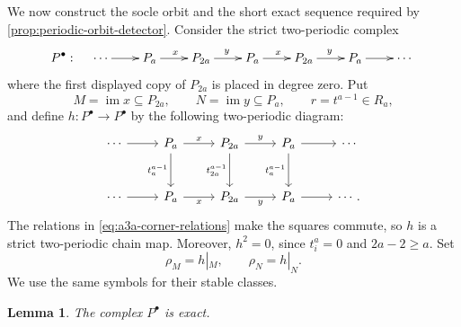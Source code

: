 \documentclass[a4paper,11pt,reqno]{amsart}
\newtheorem{lemma}[lemma]{Lemma}
\theoremstyle{definition}
\theoremstyle{plain}
\numberwithin{equation}{section}
\newcommand{\im}{\operatorname{im}}
\begin{document}
We now construct the socle orbit and the short exact sequence
required by \cref{prop:periodic-orbit-detector}.  Consider the strict
two-periodic complex
\begin{equation}
\label{eq:a3a-periodic-complex}
P^\bullet:\quad
\xymatrix@C=1.8pc{
\cdots\ar[r]&P_a\ar[r]^{x}&P_{2a}\ar[r]^{y}&P_a\ar[r]^{x}&
P_{2a}\ar[r]^{y}&P_a\ar[r]&\cdots
}
\end{equation}
where the first displayed copy of \(P_{2a}\) is placed in degree zero.  Put
\[
 M=\im x\subseteq P_{2a},\qquad N=\im y\subseteq P_a,
 \qquad r=t^{a-1}\in R_a,
\]
and define \(h:P^\bullet\to P^\bullet\) by the following two-periodic
diagram:
\[
\begin{tikzcd}[column sep=2.5em,row sep=large]
\cdots\arrow[r]&
P_a\arrow[r,"x"]\arrow[d,"t_a^{a-1}"']&
P_{2a}\arrow[r,"y"]\arrow[d,"t_{2a}^{a-1}"']&
P_a\arrow[r]\arrow[d,"t_a^{a-1}"']&
\cdots\\
\cdots\arrow[r]&
P_a\arrow[r,"x"']&
P_{2a}\arrow[r,"y"']&
P_a\arrow[r]&
\cdots .
\end{tikzcd}
\]
The relations in \eqref{eq:a3a-corner-relations} make the squares
commute, so \(h\) is a strict two-periodic chain map.  Moreover,
\(h^2=0\), since \(t_i^a=0\) and \(2a-2\ge a\).  Set
\[
 \rho_M=h|_M,\qquad \rho_N=h|_N.
\]
We use the same symbols for their stable classes.

\begin{lemma}
\label{lem:a3a-periodic-exact}
The complex \(P^\bullet\) is exact.
\end{lemma}
\end{document}
